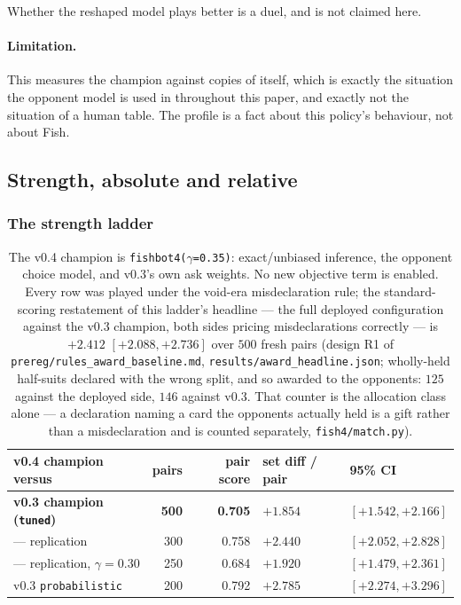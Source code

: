 \documentclass[11pt,letterpaper]{article}
\begin{document}
Whether the reshaped model plays better is a duel, and is not claimed here.

\paragraph{Limitation.} This measures the champion against copies of itself,
which is exactly the situation the opponent model is used in throughout this
paper, and exactly not the situation of a human table. The profile is a fact
about this policy's behaviour, not about Fish.

\subsection{Strength, absolute and relative}
\label{sec:strength}

\subsubsection{The strength ladder}
\label{sec:res-ladder}

\begin{table}[t]
\centering
\small
\begin{tabular}{lrrll}
\toprule
v0.4 champion versus & pairs & pair score & set diff / pair & 95\% CI \\
\midrule
\textbf{v0.3 champion (\texttt{tuned})} & \textbf{500} & \textbf{0.705} & $\mathbf{+1.854}$ & $\mathbf{[+1.542, +2.166]}$ \\
\quad --- replication & 300 & 0.758 & $+2.440$ & $[+2.052, +2.828]$ \\
\quad --- replication, $\gamma = 0.30$ & 250 & 0.684 & $+1.920$ & $[+1.479, +2.361]$ \\
v0.3 \texttt{probabilistic}    & 200 & 0.792 & $+2.785$ & $[+2.274, +3.296]$ \\
\bottomrule
\end{tabular}
\caption{The v0.4 champion is
\texttt{fishbot4($\gamma$=0.35)}: exact/unbiased inference, the opponent choice
model, and v0.3's own ask weights. No new objective term is enabled. Every
row was played under the void-era misdeclaration rule; the standard-scoring
restatement of this ladder's headline --- the full deployed configuration
against the v0.3 champion, both sides pricing misdeclarations correctly ---
is $+2.412$ $[+2.088, +2.736]$ over $500$ fresh pairs
(design R1 of \texttt{prereg/rules\_award\_baseline.md},
\texttt{results/award\_headline.json}; wholly-held half-suits declared with
the wrong split, and so awarded to the opponents: $125$ against the deployed
side, $146$ against v0.3. That counter is the allocation class alone --- a
declaration naming a card the opponents actually held is a gift rather than a
misdeclaration and is counted separately, \texttt{fish4/match.py}).}
\label{tab:ladder}
\end{table}
\end{document}
